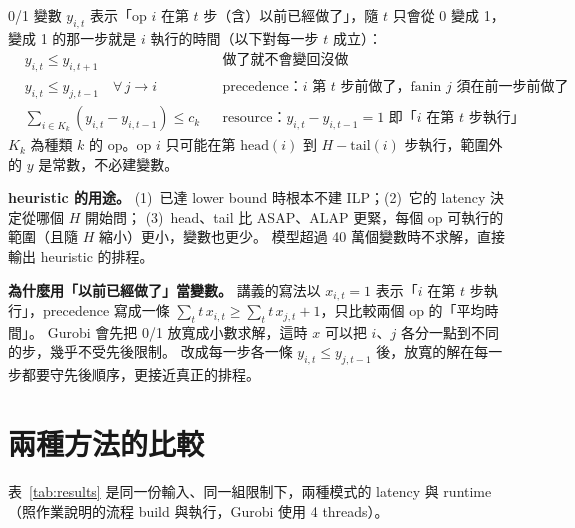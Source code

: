 \documentclass[12pt,a4paper]{article}
\begin{document}
0/1 變數 $y_{i,t}$ 表示「op $i$ 在第 $t$ 步（含）以前已經做了」，隨 $t$ 只會從 0 變成 1，變成 1 的那一步就是 $i$ 執行的時間（以下對每一步 $t$ 成立）：
\begin{align*}
&y_{i,t} \le y_{i,t+1} && \text{做了就不會變回沒做}\\
&y_{i,t} \le y_{j,t-1} \quad \forall\, j \to i && \text{precedence：$i$ 第 $t$ 步前做了，fanin $j$ 須在前一步前做了}\\
&\textstyle\sum_{i \in K_k} \left(y_{i,t} - y_{i,t-1}\right) \le c_k && \text{resource：$y_{i,t}-y_{i,t-1}=1$ 即「$i$ 在第 $t$ 步執行」}
\end{align*}
$K_k$ 為種類 $k$ 的 op。op $i$ 只可能在第 $\mathrm{head}(i)$ 到 $H-\mathrm{tail}(i)$ 步執行，範圍外的 $y$ 是常數，不必建變數。

\textbf{heuristic 的用途。}
(1)~已達 lower bound 時根本不建 ILP；(2)~它的 latency 決定從哪個 $H$ 開始問；
(3)~head、tail 比 ASAP、ALAP 更緊，每個 op 可執行的範圍（且隨 $H$ 縮小）更小，變數也更少。
模型超過 40 萬個變數時不求解，直接輸出 heuristic 的排程。

\textbf{為什麼用「以前已經做了」當變數。}
講義的寫法以 $x_{i,t}=1$ 表示「$i$ 在第 $t$ 步執行」，precedence 寫成一條 $\sum_t t\,x_{i,t} \ge \sum_t t\,x_{j,t}+1$，只比較兩個 op 的「平均時間」。
Gurobi 會先把 0/1 放寬成小數求解，這時 $x$ 可以把 $i$、$j$ 各分一點到不同的步，幾乎不受先後限制。
改成每一步各一條 $y_{i,t} \le y_{j,t-1}$ 後，放寬的解在每一步都要守先後順序，更接近真正的排程。

\section{兩種方法的比較}

表~\ref{tab:results} 是同一份輸入、同一組限制下，兩種模式的 latency 與 runtime（照作業說明的流程 build 與執行，Gurobi 使用 4 threads）。
\end{document}
